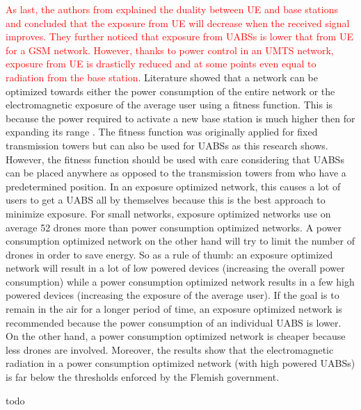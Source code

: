 \textcolor{red}{
   As last, the authors from \cite{J10.1.1} explained the duality between \gls{UE} and base stations and concluded that the exposure 
 from \gls{UE} will decrease when the received signal improves. They further noticed that 
 exposure from \gls{UABS}s is lower that from \gls{UE} for a GSM network. However, thanks to power control in an \gls{UMTS} network,
 exposure from \gls{UE} is drasticlly reduced and at some points even equal to radiation from the base station.
}
Literature showed that a network can be optimized towards either the power consumption of the entire network 
or the electromagnetic exposure of the average user using a fitness function. This is because the power required to activate a new 
base station is much higher then for expanding its range \cite{J1}.
The fitness function was originally applied for fixed transmission towers but can also be used 
for \gls{UABS}s as this research shows.
However, the fitness function should be used with care considering that \gls{UABS}s can be placed anywhere as opposed to 
the transmission towers from \cite{J1} who have a predetermined position.  
In an exposure optimized network, this causes a lot of users to get a \gls{UABS} all by themselves because this is the best approach to minimize exposure.
For small networks, exposure optimized networks use on average 52 drones more than power consumption optimized networks.
A power consumption optimized network on the other hand will try to limit the number of drones 
in order to save energy. So as a rule of thumb: an exposure optimized network will result in a lot of low powered devices (increasing the overall power consumption)
while a power consumption optimized network results in a few high powered devices (increasing the exposure of the average user).
If the goal is to remain in the air for a longer period of time, an exposure optimized network is recommended because the power consumption of 
an individual \gls{UABS} is lower.
On the other hand, a power consumption optimized network is cheaper because less drones are involved.
Moreover, the results show that the electromagnetic radiation in a power consumption optimized network (with high powered \gls{UABS}s)
is far below the thresholds enforced by the Flemish government.



todo

